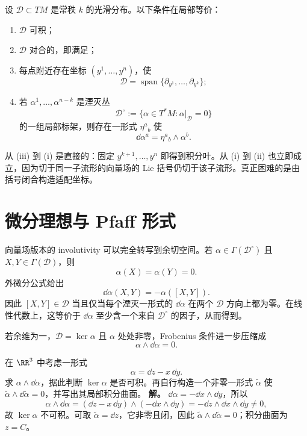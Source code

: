 \begin{theorem}[Frobenius 定理]\label{thm:math-dg-frobenius}
设 $\mathcal D\subset TM$ 是常秩 $k$ 的光滑分布。以下条件在局部等价：
\begin{enumerate}[label=(\roman*)]
\item $\mathcal D$ 可积；
\item $\mathcal D$ 对合的，即满足；
\item 每点附近存在坐标 $(y^1,\ldots,y^n)$，使
\[
\mathcal D
=\operatorname{span}\{\partial_{y^1},\ldots,\partial_{y^k}\};
\]
\item 若 $\alpha^1,\ldots,\alpha^{n-k}$ 是湮灭丛
\[
\mathcal D^\circ
:=\{\alpha\in T^*M:\alpha|_{\mathcal D}=0\}
\]
的一组局部标架，则存在一形式 $\eta^a{}_b$ 使
\begin{equation}\label{eq:math-dg-frobenius-pfaff}
\dd\alpha^a=\eta^a{}_b\wedge\alpha^b.
\end{equation}
\end{enumerate}
\end{theorem}

从 (iii) 到 (i) 是直接的：固定 $y^{k+1},\ldots,y^n$ 即得到积分叶。从 (i) 到 (ii) 也立即成立，因为切于同一子流形的向量场的 Lie 括号仍切于该子流形。真正困难的是由括号闭合构造适配坐标。

\section{微分理想与 Pfaff 形式}

向量场版本的 involutivity 可以完全转写到余切空间。若 $\alpha\in\Gamma(\mathcal D^\circ)$ 且 $X,Y\in\Gamma(\mathcal D)$，则
\[
\alpha(X)=\alpha(Y)=0.
\]
外微分公式给出
\begin{equation}\label{eq:math-dg-frobenius-dalpha-bracket}
\dd\alpha(X,Y)
=-\alpha([X,Y]).
\end{equation}
因此 $[X,Y]\in\mathcal D$ 当且仅当每个湮灭一形式的 $\dd\alpha$ 在两个 $\mathcal D$ 方向上都为零。在线性代数上，这等价于 $\dd\alpha$ 至少含一个来自 $\mathcal D^\circ$ 的因子，从而得到。

若余维为一，$\mathcal D=\ker\alpha$ 且 $\alpha$ 处处非零，Frobenius 条件进一步压缩成
\begin{equation}\label{eq:math-dg-frobenius-codim-one}
\boxed{\alpha\wedge\dd\alpha=0.}
\end{equation}


\par
\begin{workedexample}
在 \(\RR^3\) 中考虑一形式
\[
\alpha=\dd z-x\,\dd y.
\]
求 \(\alpha\wedge\dd\alpha\)，据此判断 \(\ker\alpha\) 是否可积。再自行构造一个非零一形式 \(\widetilde\alpha\) 使 \(\widetilde\alpha\wedge\dd\widetilde\alpha=0\)，并写出其局部积分曲面。
\textbf{解。} \(\dd\alpha=-\dd x\wedge\dd y\)，所以
\[
\alpha\wedge\dd\alpha=(\dd z-x\,\dd y)\wedge(-\dd x\wedge\dd y)
=-\dd z\wedge\dd x\wedge\dd y\ne0,
\]
故 \(\ker\alpha\) 不可积。可取 \(\widetilde\alpha=\dd z\)，它非零且闭，因此 \(\widetilde\alpha\wedge\dd\widetilde\alpha=0\)；积分曲面为 \(z=C\)。
\end{workedexample}
\par

